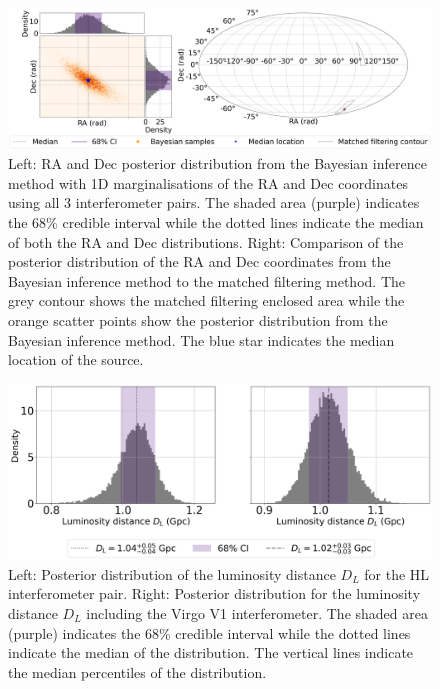 \documentclass[11pt,a4paper]{article}
\begin{document}
\begin{landscape}
\begin{figure}
    \includegraphics[width=\columnwidth, keepaspectratio]{../figures/radec_posterior_HLV.png}
    \caption{Left: RA and Dec posterior distribution from the Bayesian inference method with 1D marginalisations of the RA and Dec coordinates using all 3 interferometer pairs. The shaded area (purple) indicates the 68\% credible interval while the dotted lines indicate the median of both the RA and Dec distributions. Right: Comparison of the posterior distribution of the RA and Dec coordinates from the Bayesian inference method to the matched filtering method. The grey contour shows the matched filtering enclosed area while the orange scatter points show the posterior distribution from the Bayesian inference method. The blue star indicates the median location of the source.}
    \label{fig:hlv_compare}
\end{figure}
\end{landscape}

\begin{figure}
    \includegraphics[width=\columnwidth, keepaspectratio]{../figures/dl_posterior.png}
    \caption{Left: Posterior distribution of the luminosity distance $D_L$ for the HL interferometer pair. Right: Posterior distribution for the luminosity distance $D_L$ including the Virgo V1 interferometer. The shaded area (purple) indicates the 68\% credible interval while the dotted lines indicate the median of the distribution. The vertical lines indicate the median percentiles of the distribution.}
    \label{fig:luminosity_distance}
\end{figure}
\end{document}
